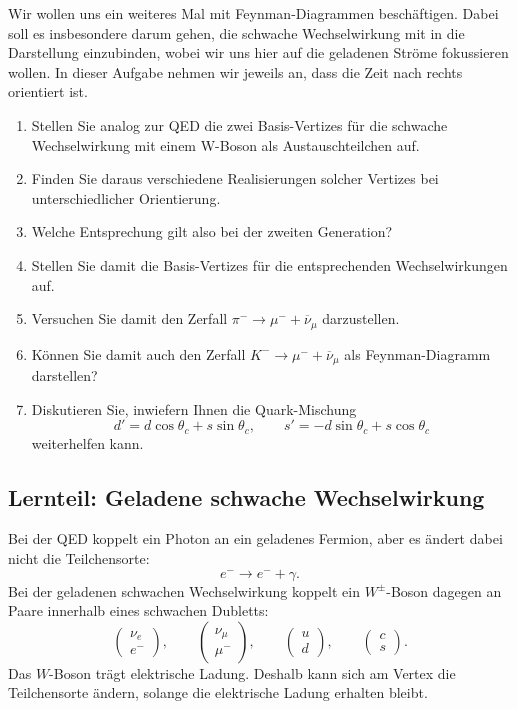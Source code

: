 \documentclass[11pt,a4paper]{scrartcl}
\newcommand{\mum}{\mu^-}
\newcommand{\numub}{\overline{\nu}_\mu}
\newcommand{\pionm}{\pi^-}
\newcommand{\kaonm}{K^-}
\theoremstyle{definition}
\theoremstyle{plain}
\theoremstyle{remark}
\begin{document}
\begin{taskbox}
Wir wollen uns ein weiteres Mal mit Feynman-Diagrammen beschäftigen. Dabei soll es insbesondere darum gehen, die schwache Wechselwirkung mit in die Darstellung einzubinden, wobei wir uns hier auf die geladenen Ströme fokussieren wollen. In dieser Aufgabe nehmen wir jeweils an, dass die Zeit nach rechts orientiert ist.

\begin{enumerate}[label=(\alph*)]
    \item Stellen Sie analog zur QED die zwei Basis-Vertizes für die schwache Wechselwirkung mit einem W-Boson als Austauschteilchen auf.
    \item Finden Sie daraus verschiedene Realisierungen solcher Vertizes bei unterschiedlicher Orientierung.
    \item Welche Entsprechung gilt also bei der zweiten Generation?
    \item Stellen Sie damit die Basis-Vertizes für die entsprechenden Wechselwirkungen auf.
    \item Versuchen Sie damit den Zerfall $\pionm\to\mum+\numub$ darzustellen.
    \item Können Sie damit auch den Zerfall $\kaonm\to\mum+\numub$ als Feynman-Diagramm darstellen?
    \item Diskutieren Sie, inwiefern Ihnen die Quark-Mischung
    \[
        d'=d\cos\theta_c+s\sin\theta_c,
        \qquad
        s'=-d\sin\theta_c+s\cos\theta_c
    \]
    weiterhelfen kann.
\end{enumerate}
\end{taskbox}

\subsection{Lernteil: Geladene schwache Wechselwirkung}

\begin{learningbox}
Bei der QED koppelt ein Photon an ein geladenes Fermion, aber es ändert dabei nicht die Teilchensorte:
\[
    e^-\to e^-+\gamma.
\]
Bei der geladenen schwachen Wechselwirkung koppelt ein $W^\pm$-Boson dagegen an Paare innerhalb eines schwachen Dubletts:
\[
    \begin{pmatrix}
    \nu_e\\ e^-
    \end{pmatrix},
    \qquad
    \begin{pmatrix}
    \nu_\mu\\ \mu^-
    \end{pmatrix},
    \qquad
    \begin{pmatrix}
    u\\ d
    \end{pmatrix},
    \qquad
    \begin{pmatrix}
    c\\ s
    \end{pmatrix}.
\]
Das $W$-Boson trägt elektrische Ladung. Deshalb kann sich am Vertex die Teilchensorte ändern, solange die elektrische Ladung erhalten bleibt.
\end{learningbox}
\end{document}
